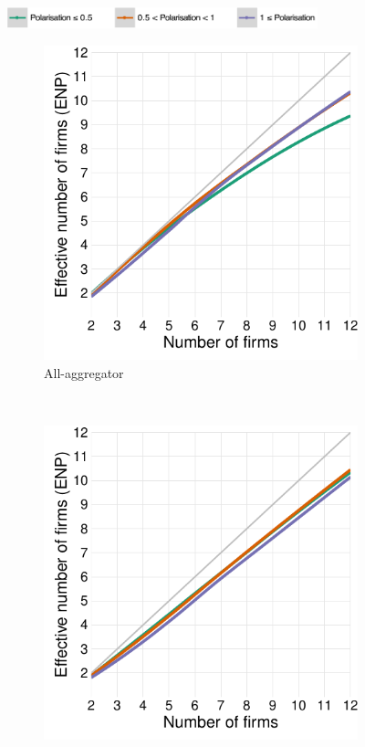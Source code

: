 \documentclass[preprint, 12pt]{elsarticle}
\begin{document}
\begin{figure}[ht!]
	\centering
	\caption{Effective number of firms (ENP) where $\mu \in [0, 1.5]$ and $n_l/n_r \in [1, 2]$.}
	\includegraphics[width=90mm]{Graphics/legend_pol.pdf}
	
	\begin{subfigure}[t]{0.315\textwidth}
		\centering
		\includegraphics[width=\textwidth, trim={8mm 0 0 0}]{Graphics/fig332a_tall.pdf}
		\caption{All-aggregator}
		\label{fig:enp_aggregator}
	\end{subfigure}
	~
	\begin{subfigure}[t]{0.315\textwidth}
		\centering
		\includegraphics[width=\textwidth, trim={8mm 0 0 0}]{Graphics/fig322a_tall.pdf}

\end{subfigure}
\end{figure}
\end{document}
